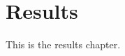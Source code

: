 \documentclass[../main.tex]{subfiles}
\begin{document}
\chapter{Results}

This is the results chapter.
\end{document}
